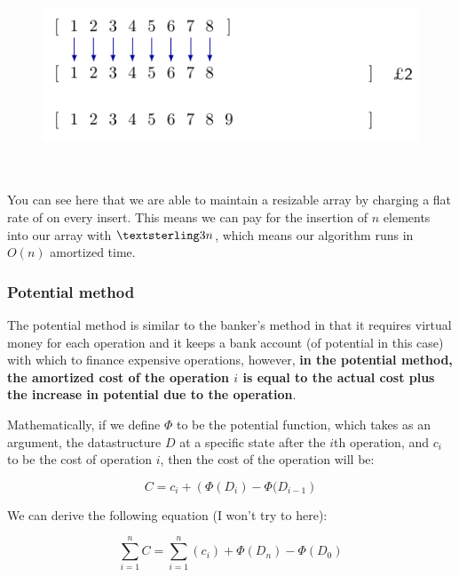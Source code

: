 \begin{figure}[H]
  \centering
  \includegraphics[height=60mm]{diagrams/banker9.pdf}
  \label{banker9}
\end{figure}

You can see here that we are able to maintain a resizable array by charging a
flat rate of  on every insert. This means we can pay for the
insertion of $n$ elements into our array with $\textsterling 3n$, which means
our algorithm runs in $O(n)$ amortized time.

\subsubsection{Potential method}


The potential method is similar to the banker's method in that it requires
virtual money for each operation and it keeps a bank account (of potential in
this case) with which to finance expensive operations, however, \textbf{in the
potential method, the amortized cost of the operation $i$ is equal to the actual
cost plus the increase in potential due to the operation}.

Mathematically, if we define $\Phi$ to be the potential function, which takes as
an argument, the datastructure $D$ at a specific state after the $i$th
operation, and $c_i$ to be the cost of operation $i$, then the cost of the
operation will be:

\[
  C = c_i + \left(\Phi(D_i) - \Phi(D_{i-1}\right)
\]

We can derive the following equation (I won't try to here):

\[
  \sum\limits_{i=1}^n C = \sum\limits_{i=1}^n \left( c_i \right) + \Phi(D_n) - \Phi(D_{0})
\]

